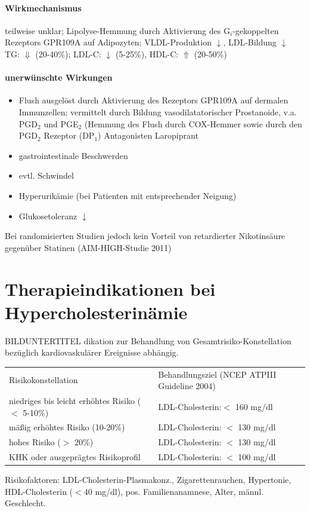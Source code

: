 \documentclass[10pt,a4paper]{report}
\begin{document}
\paragraph{Wirkmechanismus} %
\label{par:wirkmechanismus}
teilweise unklar; Lipolyse-Hemmung durch Aktivierung des G$_i$-gekoppelten Rezeptors GPR109A auf Adipozyten; VLDL-Produktion $\downarrow$, LDL-Bildung $\downarrow$
TG: $\Downarrow$ (20-40\%); LDL-C: $\downarrow$ (5-25\%), HDL-C: $\Uparrow$ (20-50\%)
\paragraph{unerwünschte Wirkungen} %
\label{par:unerw_nschte_wirkungen}
\begin{itemize}
	\item Flush	ausgelöst durch Aktivierung des Rezeptors GPR109A auf dermalen Immunzellen; vermittelt durch Bildung vasodilatatorischer Prostanoide, v.a. PGD$_2$ und PGE$_2$ (Hemmung des Flush durch COX-Hemmer sowie durch den PGD$_2$ Rezeptor (DP$_1$) Antagonisten Laropiprant
	\item gastrointestinale Beschwerden   
	\item evtl. Schwindel
	\item Hyperurikämie (bei Patienten mit entsprechender Neigung)
	\item Glukosetoleranz $\downarrow$
\end{itemize}
Bei randomisierten Studien jedoch kein Vorteil von retardierter Nikotinsäure gegenüber Statinen (AIM-HIGH-Studie 2011)
\section{Therapieindikationen bei Hypercholesterinämie} %
\label{sec:therapieindikationen_bei_hypercholesterin_mie}
BILDUNTERTITEL dikation zur Behandlung von Gesamtrisiko-Konstellation bezüglich 	kardiovaskulärer Ereignisse abhängig.\\
\begin{tabularx}{\textwidth}{XX}
Risikokonstellation&Behandlungsziel (NCEP ATPIII Guideline 2004)\\
niedriges bis leicht erhöhtes Risiko ($<$ 5-10\%)	&LDL-Cholesterin:$<$ 160 mg/dl\\
mäßig erhöhtes Risiko (10-20\%)&LDL-Cholesterin: $<$ 130 mg/dl\\
hohes Risiko ($>$ 20\%)&LDL-Cholesterin: $<$ 130 mg/dl\\
KHK oder ausgeprägtes Risikoprofil&LDL-Cholesterin: $<$ 100 mg/dl\\
\end{tabularx}
Risikofaktoren: LDL-Cholesterin-Plasmakonz., Zigarettenrauchen, Hypertonie, HDL-Cholesterin ($<$40 mg/dl), pos. Familienanamnese, Alter, männl. Geschlecht.
\end{document}
